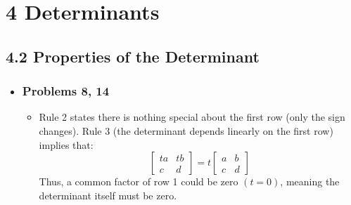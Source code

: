\chapter{4 Determinants}

\section{4.2 Properties of the Determinant}
\begin{itemize}
  \item[]

  \subsection{Problems 8, 14}
  \begin{enumerate}
    \begin{itemize}
      \item Rule 2 states there is nothing special about the first
    row (only the sign changes). Rule 3 (the determinant depends
    linearly on the first row) implies that:
    \[%
    \begin{bmatrix}
      ta & tb \\
      c & d
    \end{bmatrix} =
    t
    \begin{bmatrix}
      a  & b \\
      c & d
    \end{bmatrix}
    \]%
    Thus, a common factor of row 1 could be zero \((t=0)\), meaning the
    determinant itself must be zero.
    \end{itemize}



\end{enumerate}
\end{itemize}
